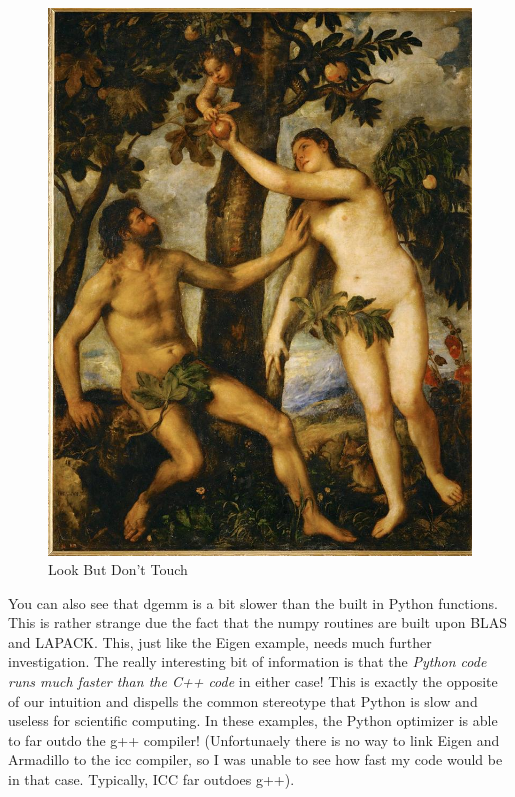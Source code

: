 \begin{figure}
\centering
\includegraphics[scale = 0.5]{AE.jpeg}
\caption{Look But Don't Touch}
\end{figure} 

You can also see that dgemm is a bit slower than the built in Python functions. This is rather strange due the  fact that the numpy routines are built upon BLAS and LAPACK. This, just like the Eigen example, needs much further investigation.
The really interesting bit of information is that the \emph{Python code runs much faster than the C++ code} in either case! This is exactly the opposite of our intuition and dispells the common stereotype that Python is slow and useless for scientific computing. In these examples, the Python optimizer is able to far outdo the g++ compiler! (Unfortunaely there is no way to link Eigen and Armadillo to the icc compiler, so I was unable to see how fast my code would be in that case. Typically, ICC far outdoes g++).